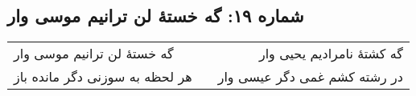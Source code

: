 \begin{center}
\section*{شماره ۱۹: گه خستۀ لن ترانیم موسی وار}
\label{sec:019}
\begin{longtable}{l p{0.5cm} r}
گه خستهٔ لن ترانیم موسی وار
&&
گه کشتهٔ نامرادیم یحیی وار
\\
هر لحظه به سوزنی دگر مانده باز
&&
در رشته کشم غمی دگر عیسی وار
\\
\end{longtable}
\end{center}
